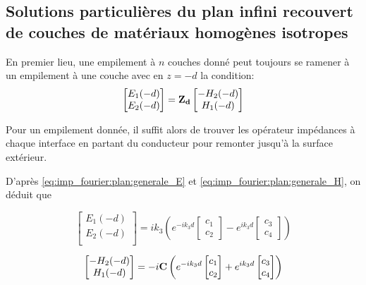 \subsection{Solutions particulières du plan infini recouvert de couches de matériaux homogènes isotropes}

En premier lieu, une empilement à $n$ couches donné peut toujours se ramener à un empilement à une couche avec en $z=-d$ la condition:
\begin{equation}
    \begin{bmatrix}
        E_1(-d)\\
        E_2(-d)\\
    \end{bmatrix}
    =
    \mathbf{Z_{d}} 
    \begin{bmatrix}
        -H_2(-d)\\
        H_1(-d)\\
    \end{bmatrix}
\end{equation}

Pour un empilement donnée, il suffit alors de trouver les opérateur impédances à chaque interface en partant du conducteur pour remonter jusqu'à la surface extérieur.

D'après \eqref{eq:imp_fourier:plan:generale_E} et \eqref{eq:imp_fourier:plan:generale_H}, on déduit que

\begin{equation}
    \begin{bmatrix}
        E_1(-d)\\
        E_2(-d)\\
    \end{bmatrix}
    = ik_3\left( e^{-ik_3 d}
    \begin{bmatrix}
        c_1 \\
        c_2
    \end{bmatrix}
    -e^{ik_3 d}
    \begin{bmatrix}
        c_3 \\
        c_4
    \end{bmatrix}
    \right)
\end{equation}

\begin{equation}
    \begin{bmatrix}
        -H_2(-d)\\
        H_1(-d)\\
    \end{bmatrix}
    =-i
    \mathbf{C}
    \left(
        e^{-ik_3 d}
        \begin{bmatrix}
            c_1 \\
            c_2
        \end{bmatrix}
        +e^{ik_3 d}
        \begin{bmatrix}
            c_3 \\
            c_4
        \end{bmatrix}
    \right)
\end{equation}

